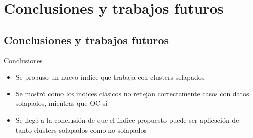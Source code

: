 \section{Conclusiones y trabajos futuros}
\subsection*{Conclusiones y trabajos futuros}
\begin{frame}
	\begin{block} {Conclusiones}
		\begin{itemize}
			\item<1-> Se propuso un nuevo índice que trabaja con clusters solapados
			\item<2-> Se mostró como los índices clásicos no reflejan correctamente casos con datos
						solapados, mientras que OC sí.
			\item<3-> Se llegó a la conclusión de que el índice propuesto puede ser aplicación de tanto clusters solapados como no solapados

		\end{itemize}
	\end{block}

\end{frame}


